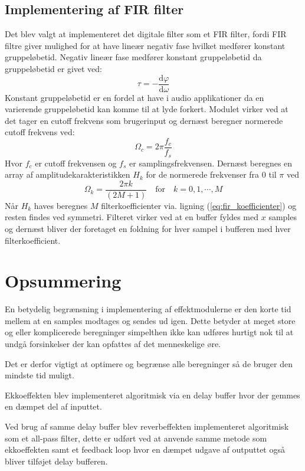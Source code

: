 \subsection{Implementering af FIR filter}
Det blev valgt at implementeret det digitale filter som et FIR filter, fordi FIR filtre giver mulighed for at have lineær negativ fase hvilket medfører konstant gruppeløbetid.\newline
Negativ lineær fase medfører konstant gruppeløbetid da gruppeløbetid er givet ved\cite{wikiGroupdelay}:
\[
\tau = -\frac{\mathrm{d}\varphi}{\mathrm{d}\omega}
\]
Konstant gruppeløbetid er en fordel at have i audio applikationer da en varierende gruppeløbetid kan komme til at lyde forkert.\newline
Modulet virker ved at det tager en cutoff frekvens som brugerinput og dernæst beregner normerede cutoff frekvens ved:
\[ \Omega_c = 2\pi\frac{f_c}{f_s} \]
Hvor $f_c$ er cutoff frekvensen og $f_s$ er samplingsfrekvensen.
Dernæst beregnes en array af amplitudekarakteristikken $H_k$ for de normerede frekvenser fra $0$ til $\pi$ ved 
\[ \Omega_k = \frac{2\pi k}{(2M + 1)} \quad \mathrm{for} \quad k = 0, 1, \cdots, M \]
Når $H_k$ haves beregnes $M$ filterkoefficienter via. ligning (\ref{eq:fir_koefficienter}) og resten findes ved symmetri.\newline
Filteret virker ved at en buffer fyldes med $x$ samples og dernæst bliver der foretaget en foldning for hver sampel i bufferen med hver filterkoefficient.

\section{Opsummering}
En betydelig begrænsning i implementering af effektmodulerne er den korte tid mellem at en samples modtages og sendes ud igen.
Dette betyder at  meget store og eller komplicerede beregninger simpelthen ikke kan udføres hurtigt nok til at undgå forsinkelser der kan opfattes af det menneskelige øre.

Det er derfor vigtigt at optimere og begrænse alle beregninger så de bruger den mindste tid muligt. 

Ekkoeffekten blev implementeret algoritmisk via en delay buffer hvor der gemmes en dæmpet del af inputtet.

Ved brug af samme delay buffer blev reverbeffekten implementeret algoritmisk som et all-pass filter, dette er udført ved at anvende samme metode som ekkoeffekten samt et feedback loop hvor en dæmpet udgave af outputtet også bliver tilføjet delay bufferen.

